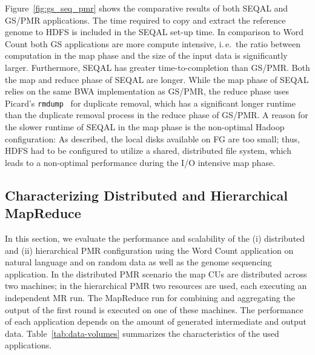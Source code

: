 \documentclass{acm_proc_article-sp}
\newcommand{\jhanote}[1]{ {\textcolor{red} { ***SJ: #1 }}}
\newcommand{\alnote}[1]{ {\textcolor{blue} { ***andreL: #1 }}}
\newcommand{\pnote}[1]{ {\textcolor{magenta} { ***pradeep: #1 }}}
\newcommand{\alnote}[1]{}
\newcommand{\pnote}[1]{}
\newcommand{\jhanote}[1]{}
\newcommand{\upp}{\vspace*{-0.5em}}
\begin{document}
Figure~\ref{fig:gs_seq_pmr} shows the comparative results of both SEQAL and
GS/PMR applications. The time required to copy and extract the reference genome
to HDFS is included in the SEQAL set-up time. In comparison to Word Count both
GS applications are more compute intensive, i.\,e.\ the ratio between
computation in the map phase and the size of the input data is significantly
larger. Furthermore, SEQAL has greater time-to-completion than GS/PMR. Both the
map and reduce phase of SEQAL are longer. While the map phase of SEQAL relies on
the same BWA implementation as GS/PMR, the reduce phase uses Picard's
\texttt{rmdump}~\cite{picard} for duplicate removal, which has a significant
longer runtime than the duplicate removal process in the reduce phase of GS/PMR.
A reason for the slower runtime of SEQAL in the map phase is the non-optimal
Hadoop configuration: As described, the local disks available on FG are too
small; thus, HDFS had to be configured to utilize a shared, distributed file
system, which leads to a non-optimal performance during the I/O intensive map
phase.


\upp
\subsection{Characterizing Distributed and Hierarchical MapReduce}


In this section, we evaluate the performance and scalability of the (i)
distributed and (ii) hierarchical PMR configuration using the Word Count
application on natural language and on random data as well as the genome
sequencing application. In the distributed PMR scenario the map CUs are
distributed across two machines; in the hierarchical PMR two resources are used,
each executing an independent MR run. The MapReduce run for combining and
aggregating the output of the first round is executed on one of these machines.
The performance of each application depends on the amount of generated
intermediate and output data. Table~\ref{tab:data-volumes} summarizes the
characteristics of the used applications.
\end{document}
